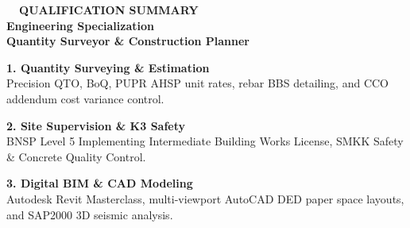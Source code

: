 \documentclass[10pt,a4paper,landscape]{article}
\begin{document}
\begin{minipage}[t]{0.32\linewidth}
  \vspace{0pt}
  \begin{tcolorbox}[sharp corners, boxrule=0.8pt, colframe=pborder, colback=pbglight, left=3mm, right=3mm, top=2.5mm, bottom=2.5mm, height=154mm]
    \colorbox{pred}{\fontsize{7pt}{8pt}\selectfont\bfseries\color{white}\ \ QUALIFICATION SUMMARY\ \ }\\[1.5mm]
    {\fontsize{9.5pt}{11.5pt}\selectfont\bfseries\color{pnavy}Engineering Specialization}\\[0.5mm]
    {\fontsize{7pt}{8.5pt}\selectfont\bfseries\color{pmuted}Quantity Surveyor \& Construction Planner}\\[2.5mm]

    \begin{tcolorbox}[sharp corners, boxrule=0.5pt, colframe=pborder, colback=white, left=2mm, right=2mm, top=1.8mm, bottom=1.8mm]
      {\fontsize{7pt}{8.5pt}\selectfont\bfseries\color{pnavy}1. Quantity Surveying \& Estimation}\\[0.3mm]
      {\fontsize{6.3pt}{7.8pt}\selectfont\color{psteel}Precision QTO, BoQ, PUPR AHSP unit rates, rebar BBS detailing, and CCO addendum cost variance control.}
    \end{tcolorbox}
    \vspace{1.5mm}

    \begin{tcolorbox}[sharp corners, boxrule=0.5pt, colframe=pborder, colback=white, left=2mm, right=2mm, top=1.8mm, bottom=1.8mm]
      {\fontsize{7pt}{8.5pt}\selectfont\bfseries\color{pnavy}2. Site Supervision \& K3 Safety}\\[0.3mm]
      {\fontsize{6.3pt}{7.8pt}\selectfont\color{psteel}BNSP Level 5 Implementing Intermediate Building Works License, SMKK Safety \& Concrete Quality Control.}
    \end{tcolorbox}
    \vspace{1.5mm}

    \begin{tcolorbox}[sharp corners, boxrule=0.5pt, colframe=pborder, colback=white, left=2mm, right=2mm, top=1.8mm, bottom=1.8mm]
      {\fontsize{7pt}{8.5pt}\selectfont\bfseries\color{pnavy}3. Digital BIM \& CAD Modeling}\\[0.3mm]
      {\fontsize{6.3pt}{7.8pt}\selectfont\color{psteel}Autodesk Revit Masterclass, multi-viewport AutoCAD DED paper space layouts, and SAP2000 3D seismic analysis.}
    \end{tcolorbox}
    \vspace{1.5mm}


\end{tcolorbox}
\end{minipage}
\end{document}
